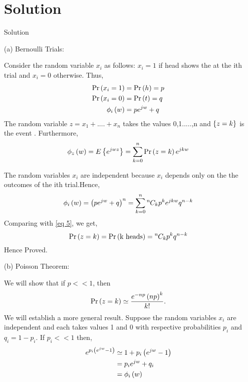 \documentclass{beamer}
\begin{document}
\section{Solution}
\begin{frame}{Solution}

    (a) Bernoulli Trials:
    
    Consider the random variable $x_i$ as follows: $x_i = 1$ if head shows the at the ith trial and $x_i = 0$ otherwise. Thus,
    \begin{align}
        \Pr\left(x_i = 1\right) &= \Pr\left(h\right) = p \\
        \Pr\left(x_i = 0\right) &= \Pr\left(t\right) = q  \\
        \phi_i\left(w\right) &= pe^{jw} + q
    \end{align}
    The random variable $z = x_1 + ....+x_n$ takes the values 0,1.....,n and $\left\{z = k\right\}$ is the event . Furthermore, 
    \begin{equation}
        \phi_z\left(w\right) = E\left\{e^{jwz}\right\} = \sum_{k=0}^{n}\Pr\left(z = k\right)e^{jkw} \label{eq 5}
    \end{equation}
    
\end{frame}

\begin{frame}{}
The random variables $x_i$ are independent because $x_i$ depends only on the the outcomes of the ith trial.Hence,
    \begin{equation}
        \phi_i\left(w\right) = \left(pe^{jw} + q\right)^n = \sum_{k=0}^{n}{{}^{n}\mkern-1muC_{k}}p^{k}e^{jkw}q^{n-k}
    \end{equation}
    Comparing with \eqref{eq 5}, we get,
    \begin{equation}
        \Pr\left(z = k\right) = \Pr\left(\text{k heads}\right) = {{}^{n}\mkern-1muC_{k}}p^{k}q^{n-k}
    \end{equation}
    Hence Proved.
    
\end{frame}

\begin{frame}{}
  (b) Poisson Theorem:
    
    We will show that if $p << 1$, then
    \begin{equation}
        \Pr\left(z = k\right) \simeq \frac{e^{-np}\left(np\right)^k}{k!}.
    \end{equation}
    We will establish a more general result. Suppose the random variables $x_i$ are independent and each takes values 1 and 0 with respective probabilities $p_i$ and $q_i = 1 - p_i$. If $p_i << 1$ then,
    \begin{align}
        e^{p_i\left(e^{jw}-1\right)} &\simeq 1 + p_i\left(e^{jw} - 1\right) \\
                             &= p_ie^{jw} + q_i \\
                             &= \phi_i\left(w\right)
    \end{align}
\end{frame}
\end{document}
